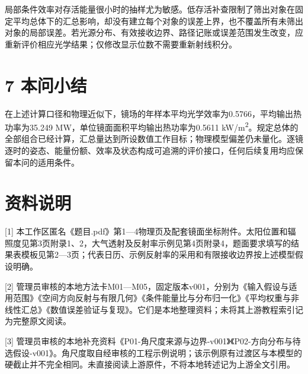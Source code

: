 \documentclass[UTF8,fontset=windows,zihao=-4]{ctexart}
\begin{document}
局部条件效率对存活能量很小时的抽样尤为敏感。低存活补查限制了筛出对象在固定平均总体下的汇总影响，却没有建立每个对象的误差上界，也不覆盖所有未筛出对象的局部误差。若光源分布、有效接收边界、路径记账或误差范围发生改变，应重新评价相应光学结果；仅修改显示位数不需要重新射线积分。

\section*{7 本问小结}

在上述计算口径和物理近似下，镜场的年样本平均光学效率为0.5766，平均输出热功率为35.249 MW，单位镜面面积平均输出热功率为0.5611 kW/m\textsuperscript{2}。规定总体的全部组合已经计算，汇总量达到所设数值工作目标；物理模型偏差仍未量化。逐镜逐时的姿态、能量份额、效率及状态构成可追溯的评价接口，任何后续复用均应保留本问的适用条件。

\section*{资料说明}

[1] 本工作区匿名《题目.pdf》第1—4物理页及配套镜面坐标附件。太阳位置和辐照度见第3页附录1、2，大气透射及反射率示例见第4页附录4，题面要求填写的结果表模板见第2—3页；代表日历、示例反射率的采用和有限接收边界按上述模型假设明确。

[2] 管理员审核的本地方法卡M01—M05，固定版本v001，分别为《输入假设与适用范围》《空间方向反射与有限几何》《条件能量比与分布归一化》《平均权重与非线性汇总》《数值误差验证与复现》。它们是本地整理资料；未将其上游教程索引记为完整原文阅读。

[3] 管理员审核的本地补充资料《P01-角尺度来源与边界-v001》《P02-方向分布与待选假设-v001》。角尺度取自经审核的工程示例说明；该示例原有过渡区与本模型的硬截止并不完全相同。未直接阅读上游原件，不将本地转述记为上游全文引用。
\end{document}

